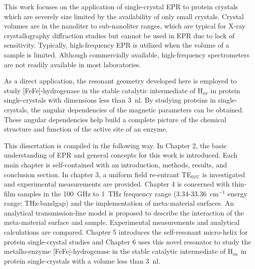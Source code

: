 This work focuses on the application of single-crystal EPR to protein crystals which are severely size limited by the availability of only small crystals. Crystal volumes are in the nanoliter to sub-nanoliter ranges, which are typical for X-ray crystallography diffraction studies but cannot be used in EPR due to lack of sensitivity. Typically, high-frequency EPR is utilized when the volume of a sample is limited. \cite{grinbergVHF} Although commercially available, high-frequency spectrometers are not readily available in most laboratories.

As a direct application, the resonant geometry developed here is employed to study [FeFe]-hydrogenase in the stable catalytic intermediate of H$_{ox}$ in protein single-crystals with dimensions less than 3~nl. By studying proteins in single-crystals, the angular dependencies of the magnetic parameters can be obtained. These angular dependencies help build a complete picture of the chemical structure and function of the active site of an enzyme.\cite{NiFe1996,NiFe2000,NiFe2003}

This dissertation is compiled in the following way. In Chapter 2, the basic understanding of EPR and general concepts for this work is introduced. Each main chapter is self-contained with an introduction, methods, results, and conclusion section. In chapter 3, a uniform field re-entrant TE$_{\text{01U}}$ is investigated and experimental measurements are provided. Chapter 4 is concerned with thin-film samples in the 100~GHz to 1~THz frequency range (3.34-33.36~cm$^{-1}$ energy range; THz-bandgap) and the implementation of meta-material surfaces. An analytical transmission-line model is proposed to describe the interaction of the meta-material surface and sample. Experimental measurements and analytical calculations are compared. Chapter 5 introduces the self-resonant micro-helix for protein single-crystal studies and Chapter 6 uses this novel resonator to study the metallo-enzyme [FeFe]-hydrogenase in the stable catalytic intermediate of H$_{ox}$ in protein single-crystals with a volume less than 3~nl.

{\renewcommand{\bibsection}{\clearpage\section*{\bibname}\markboth{\bibname}{\bibname}}
\renewcommand{\bibname}{CHAPTER 1. REFERENCES}


}